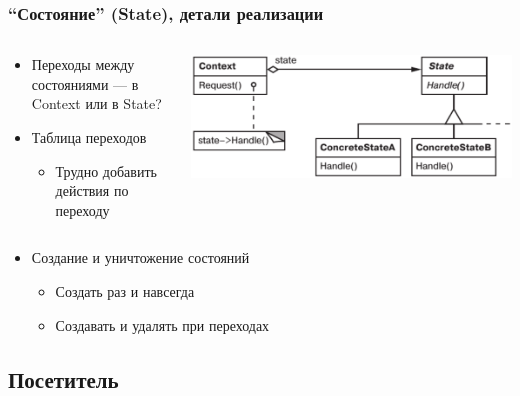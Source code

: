 \documentclass[xetex,mathserif,serif]{beamer}
\begin{document}
    \begin{frame}
        \frametitle{``Состояние'' (State), детали реализации}
        \begin{columns}
            \begin{column}{0.5\textwidth}
                \begin{itemize}
                    \item Переходы между состояниями --- в Context или в State?
                    \item Таблица переходов
                    \begin{itemize}
                        \item Трудно добавить действия по переходу
                    \end{itemize}
                \end{itemize}
            \end{column}
            \begin{column}{0.5\textwidth}
                \begin{center}
                    \includegraphics[width=\textwidth]{state.png}
                \end{center}
            \end{column}
        \end{columns}
        \begin{itemize}
            \item Создание и уничтожение состояний
            \begin{itemize}
                \item Создать раз и навсегда
                \item Создавать и удалять при переходах
            \end{itemize}
        \end{itemize}
    \end{frame}

    \subsection{Посетитель}
\end{document}
